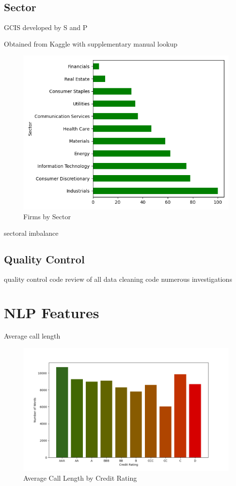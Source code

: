 \documentclass{article}
\begin{document}
    \subsection*{Sector}

    GCIS developed by S and P

    Obtained from Kaggle with supplementary manual lookup

    \begin{figure}[h!]
		\centering
        \caption{Firms by Sector}
        \includegraphics[width=0.5\linewidth,keepaspectratio=true]{../Output/All Data EDA/Tabular EDA/all_data_fixed_quarter_dates_firms_by_sector_no_title.png}
	\end{figure}

    sectoral imbalance    

    \subsection*{Quality Control}

    quality control
    code review of all data cleaning code
    numerous investigations

    \section*{NLP Features}

    Average call length

    \begin{figure}[h!]
		\centering
        \caption{Average Call Length by Credit Rating}
        \includegraphics[width=0.5\linewidth,keepaspectratio=true]{../Output/All Data EDA/NLP EDA/all_data_call_length_by_credit_rating_no_title.png}
	\end{figure}
\end{document}
